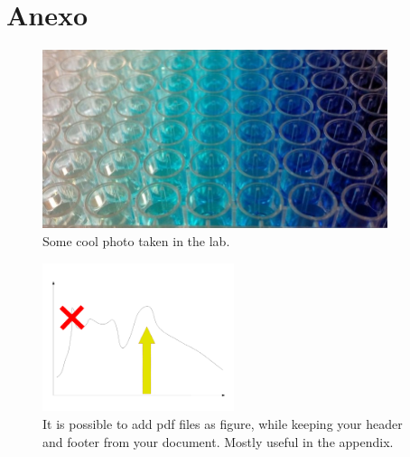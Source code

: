 \clearpage

\chapter*{\textbf{Anexo}}\label{appendix}

\begin{figure}[htb]
	\centering
		\includegraphics[width=0.9\textwidth]{pic/anyfigure.png}

	\caption[Cool picture]{Some cool photo taken in the lab.}

	\label{fig:anyfigure}
\end{figure}

\begin{figure}[htb]
	\centering

		\includegraphics[trim = 15mm 70mm 20mm 20mm, clip, rotate=90,  width=0.5\textwidth]{pic/anypdf.pdf}

	\caption[Adding PDF as figure]{It is possible to add pdf files as figure, while keeping your header and footer from your document. Mostly useful in the appendix.}

	\label{fig:pdf}
\end{figure}
